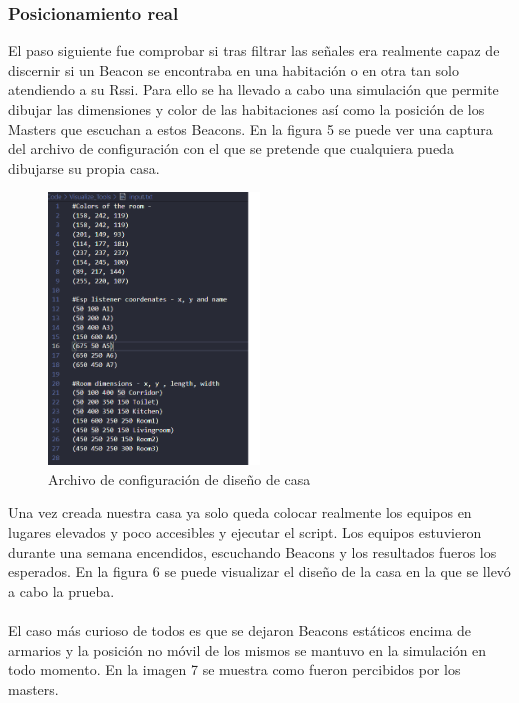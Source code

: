 \documentclass[paper=a4, fontsize=11pt,twoside]{scrartcl}
\begin{document}
        \subsubsection{Posicionamiento real}
            El paso siguiente fue comprobar si tras filtrar las señales era realmente capaz de discernir si un Beacon se encontraba en una habitación
            o en otra tan solo atendiendo a su Rssi. Para ello se ha llevado a cabo una simulación que permite dibujar las dimensiones y color de las 
            habitaciones así como la posición de los Masters que escuchan a estos Beacons. En la figura 5 se puede ver una captura del archivo de configuración 
            con el que se pretende que cualquiera pueda dibujarse su propia casa.
            \begin{center}
                \begin{figure}[]
                    \centering
                    \includegraphics[width=0.5\textwidth]{../../Memmory/images/config_file_house.PNG}
                    \caption{Archivo de configuración de diseño de casa}
                    \label{fig:mesh16}
                \end{figure}
            \end{center}
            Una vez creada nuestra casa ya solo queda colocar realmente los equipos en lugares elevados y poco accesibles y ejecutar el script.
            Los equipos estuvieron durante una semana encendidos, escuchando Beacons y los resultados fueros los esperados. En la figura 6 se puede 
            visualizar el diseño de la casa en la que se llevó a cabo la prueba.
            \paragraph{}
            El caso más curioso de todos es que se dejaron Beacons estáticos encima de armarios y la posición no móvil de los mismos 
            se mantuvo en la simulación en todo momento. En la imagen 7 se muestra como fueron percibidos por los masters.
\end{document}
